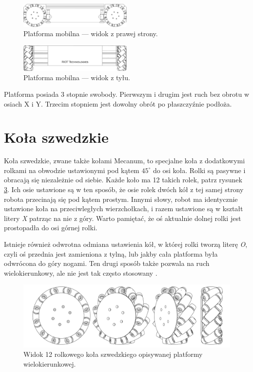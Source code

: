 \begin{figure}[H]
\centering
 \includegraphics[width=0.5\textwidth]{graphics/base_side.pdf}
\caption{Platforma mobilna --- widok z prawej strony.}
\label{fig:base_side}
\end{figure} 

\begin{figure}[H]
\centering
 \includegraphics[width=0.5\textwidth]{graphics/base_front.pdf}
\caption{Platforma mobilna --- widok z tyłu.}
\label{fig:base_front}
\end{figure} 

Platforma posiada 3 stopnie swobody. Pierwszym i drugim jest ruch bez obrotu w osiach X i Y.
Trzecim stopniem jest dowolny obrót po płaszczyźnie podłoża.

\section{Koła szwedzkie}
Koła szwedzkie, zwane także kołami Mecanum, to specjalne koła z dodatkowymi rolkami na obwodzie ustawionymi pod kątem $45^\circ$ do osi koła.
Rolki są pasywne i obracają się niezależnie od siebie. Każde koło ma 12 takich rolek, patrz rysunek \ref{fig:wheel}.
Ich osie ustawione są w ten sposób, że osie rolek dwóch kół z tej samej strony robota przecinają się pod kątem prostym.
Innymi słowy, robot ma identycznie ustawione koła na przeciwległych wierzchołkach, i razem ustawione są w kształt litery \emph{X} patrząc na nie z góry.
Warto pamiętać, że oś aktualnie dolnej rolki jest prostopadła do osi górnej rolki.

Istnieje również odwrotna odmiana ustawienia kół, w której rolki tworzą literę \emph{O}, czyli oś przednia jest zamieniona z tylną, lub jakby cała platforma była odwrócona do góry nogami.
Ten drugi sposób także pozwala na ruch wielokierunkowy, ale nie jest tak często stosowany \cite{paletobot}.

\begin{figure}[H]
\centering
 \includegraphics[width=\textwidth]{graphics/wheel.pdf}
\caption{Widok 12 rolkowego koła szwedzkiego opisywanej platformy wielokierunkowej.}
\label{fig:wheel}
\end{figure} 

